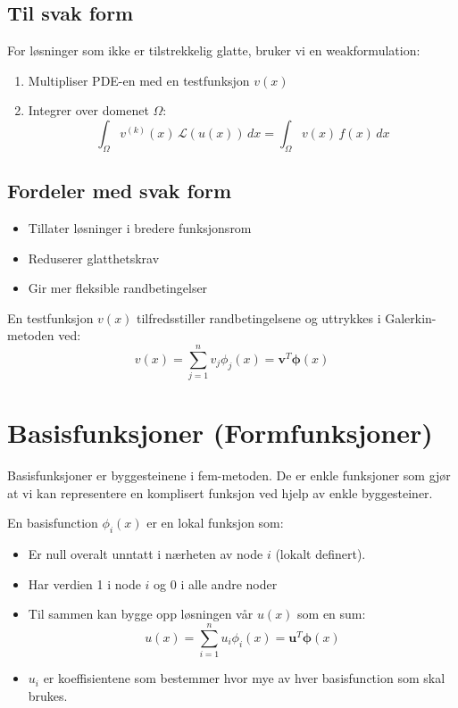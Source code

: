\subsection{Til svak form}
For løsninger som ikke er tilstrekkelig glatte, bruker vi en weakformulation:

\begin{enumerate}
    \item Multipliser PDE-en med en testfunksjon $v(x)$
    \item Integrer over domenet $\Omega$:
          \[
              \int_\Omega v^{(k)}(x) \, \mathcal{L}(u(x)) \, dx = \int_\Omega v(x) \, f(x) \, dx
          \]
\end{enumerate}

\subsection{Fordeler med svak form}
\begin{itemize}
    \item Tillater løsninger i bredere funksjonsrom
    \item Reduserer glatthetskrav
    \item Gir mer fleksible randbetingelser
\end{itemize}

En testfunksjon $v(x)$ tilfredsstiller randbetingelsene og uttrykkes i Galerkin-metoden ved:
\[
    v(x) = \sum_{j=1}^n v_j \phi_j(x) = \symbf{v}^T \symbf{\phi}(x)
\]

\section{Basisfunksjoner (Formfunksjoner)}

Basisfunksjoner er byggesteinene i fem-metoden.
De er enkle funksjoner som gjør at vi kan representere en komplisert funksjon ved hjelp av enkle byggesteiner.

En basisfunction \(\phi_i(x)\) er en lokal funksjon som:
\begin{itemize}
    \item Er null overalt unntatt i nærheten av node \(i\) (lokalt definert).
    \item Har verdien 1 i node \(i\) og 0 i alle andre noder
    \item Til sammen kan bygge opp løsningen vår \(u(x)\) som en sum:
          \[
              u(x) = \sum_{i=1}^n u_i \phi_i(x) = \symbf{u}^T \symbf{\phi}(x)
          \]
    \item \(u_i\) er koeffisientene som bestemmer hvor mye av hver basisfunction som skal brukes.
\end{itemize}


